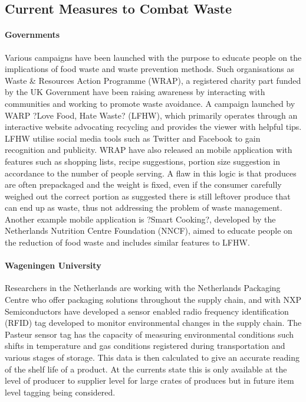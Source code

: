 \documentclass[a4paper, 11pt]{article}
\begin{document}
\subsection{Current Measures to Combat Waste}

\paragraph{Governments} Various campaigns have been launched with the purpose to educate people on the implications of food waste and waste prevention methods. Such organisations as Waste \& Resources Action Programme (WRAP), a registered charity part funded by the UK Government have been raising awareness by interacting with communities and working to promote waste avoidance. A campaign launched by WARP ?Love Food, Hate Waste? (LFHW), which primarily operates through an interactive website advocating recycling and provides the viewer with helpful tips. LFHW utilise social media tools such as Twitter and Facebook to gain recognition and publicity. WRAP have also released an mobile application with features such as shopping lists, recipe suggestions, portion size suggestion in accordance to the number of people serving. A flaw in this logic is that produces are often prepackaged and the weight is fixed, even if the consumer carefully weighed out the correct portion as suggested there is still leftover produce that can end up as waste, thus not addressing the problem of waste management. Another example mobile application is ?Smart Cooking?, developed by the Netherlands Nutrition Centre Foundation (NNCF), aimed to educate people on the reduction of food waste and includes similar features to LFHW.

\paragraph{Wageningen University}Researchers in the Netherlands are working with the Netherlands Packaging Centre who offer packaging solutions throughout the supply chain, and with NXP Semiconductors have developed a sensor enabled radio frequency identification (RFID) tag developed to monitor environmental changes in the supply chain. The Pasteur sensor tag has the capacity of measuring environmental conditions such shifts in temperature and gas conditions registered during transportation and various stages of storage. This data is then calculated to give an accurate reading of the shelf life of a product. At the currents state this is only available at the level of producer to supplier level for large crates of produces but in future item level tagging being considered. 
\end{document}
